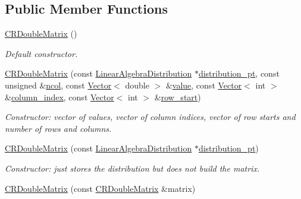 \subsection*{Public Member Functions}
\begin{DoxyCompactItemize}
\item 
\hyperlink{classoomph_1_1CRDoubleMatrix_ad8914fa1a5a98f7602a1724b76eef26c}{C\+R\+Double\+Matrix} ()
\begin{DoxyCompactList}\small\item\em Default constructor. \end{DoxyCompactList}\item 
\hyperlink{classoomph_1_1CRDoubleMatrix_a1f1ffece5cbd2d25d46fe3db3b9c3ff5}{C\+R\+Double\+Matrix} (const \hyperlink{classoomph_1_1LinearAlgebraDistribution}{Linear\+Algebra\+Distribution} $\ast$\hyperlink{classoomph_1_1DistributableLinearAlgebraObject_a603105384d60c9a3710378af39f538b9}{distribution\+\_\+pt}, const unsigned \&\hyperlink{classoomph_1_1CRDoubleMatrix_a4ed5597d8a34dd14f90b0e6cfb88ca2e}{ncol}, const \hyperlink{classoomph_1_1Vector}{Vector}$<$ double $>$ \&\hyperlink{classoomph_1_1CRDoubleMatrix_ab8220b7c2bb763dab32a4d0fea7da6f4}{value}, const \hyperlink{classoomph_1_1Vector}{Vector}$<$ int $>$ \&\hyperlink{classoomph_1_1CRDoubleMatrix_a21b3dbb8ee74e1247f80ce4506c395f8}{column\+\_\+index}, const \hyperlink{classoomph_1_1Vector}{Vector}$<$ int $>$ \&\hyperlink{classoomph_1_1CRDoubleMatrix_a25f1efd00318183abd8c65efede3f3f4}{row\+\_\+start})
\begin{DoxyCompactList}\small\item\em Constructor\+: vector of values, vector of column indices, vector of row starts and number of rows and columns. \end{DoxyCompactList}\item 
\hyperlink{classoomph_1_1CRDoubleMatrix_a80b1f351988b2a7c0bd39387c77b85f3}{C\+R\+Double\+Matrix} (const \hyperlink{classoomph_1_1LinearAlgebraDistribution}{Linear\+Algebra\+Distribution} $\ast$\hyperlink{classoomph_1_1DistributableLinearAlgebraObject_a603105384d60c9a3710378af39f538b9}{distribution\+\_\+pt})
\begin{DoxyCompactList}\small\item\em Constructor\+: just stores the distribution but does not build the matrix. \end{DoxyCompactList}\item 
\hyperlink{classoomph_1_1CRDoubleMatrix_af88437afe2b838fd6b508c590d26bd26}{C\+R\+Double\+Matrix} (const \hyperlink{classoomph_1_1CRDoubleMatrix}{C\+R\+Double\+Matrix} \&matrix)

\end{DoxyCompactItemize}
